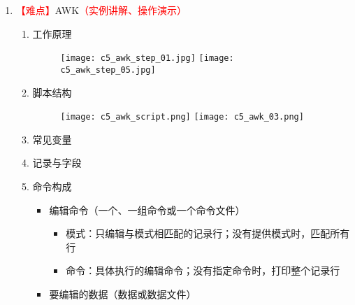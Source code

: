 \documentclass{TIJMUjiaoanLL}
\begin{document}
\begin{enumerate}
\begin{enumerate}
      \item \textcolor{red}{【难点】}AWK\textcolor{red}{（实例讲解、操作演示）}
	\begin{enumerate}
	  \item 工作原理
	  \vspace*{-10pt}
	    \begin{figure}[h]
	      \centering
	      \texttt{[image: c5\_awk\_step\_01.jpg]}
	      \quad
	      \texttt{[image: c5\_awk\_step\_05.jpg]}
	  \end{figure}
	  \vspace*{-10pt}
	  \item 脚本结构
	  \vspace*{-10pt}
	    \begin{figure}[h]
	      \centering
	      \texttt{[image: c5\_awk\_script.png]}
	      \quad
	      \texttt{[image: c5\_awk\_03.png]}
	  \end{figure}
	  \vspace*{-10pt}
	  \item 常见变量
	  \item 记录与字段
	  \item 命令构成
	    \begin{itemize}
	      \item 编辑命令（一个、一组命令或一个命令文件）
	        \begin{itemize}
	          \item 模式：只编辑与模式相匹配的记录行；没有提供模式时，匹配所有行
	          \item 命令：具体执行的编辑命令；没有指定命令时，打印整个记录行
                \end{itemize}
              \item 要编辑的数据（数据或数据文件）
	    \end{itemize}

\otherTail
\newpage
\otherHeader


\end{enumerate}
\end{enumerate}
\end{enumerate}
\end{document}
